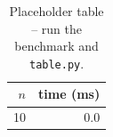 \begin{table}[t]
  \centering
  \caption{Placeholder table -- run the benchmark and \texttt{table.py}.}
  \label{tab:{{NAME}}-bench}
  \begin{tabular}{rr}
    \toprule
    $n$ & time (\unit{\milli\second}) \\
    \midrule
    10 & 0.0 \\
    \bottomrule
  \end{tabular}
\end{table}
